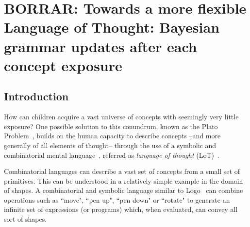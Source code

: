 

\chapter{BORRAR: Towards a more flexible Language of Thought: Bayesian grammar updates after each concept exposure}

\section{Introduction}

How can children acquire a vast universe of concepts with seemingly very little exposure? One possible solution to this conundrum, known as the Plato Problem~\cite{chomsky1986knowledge,chomsky2006cognitive}, builds on the human capacity to describe concepts --and more generally of all elements of thought-- through the use of a symbolic and combinatorial mental language~\cite{newell1980physical}, referred as {\em language of thought} (LoT)~\cite{fodor1975language}.

Combinatorial languages can describe a vast set of concepts from a small set of primitives. This can be understood in a relatively simple example in the domain of shapes. A combinatorial and symbolic language similar to Logo~\cite{abelson1974logo} can combine operations such as ``move", ``pen up", ``pen down" or ``rotate" to generate an infinite set of expressions (or programs) which, when evaluated, can convey all sort of shapes.

